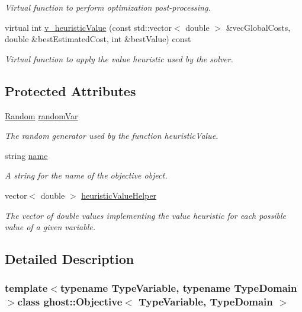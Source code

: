 \begin{DoxyCompactItemize}
\begin{DoxyCompactList}\small\item\em Virtual function to perform optimization post-\/processing. \end{DoxyCompactList}\item 
virtual int \hyperlink{classghost_1_1Objective_a03311ba62213580f1664f164e5f5696a}{v\-\_\-heuristic\-Value} (const std\-::vector$<$ double $>$ \&vec\-Global\-Costs, double \&best\-Estimated\-Cost, int \&best\-Value) const 
\begin{DoxyCompactList}\small\item\em Virtual function to apply the value heuristic used by the solver. \end{DoxyCompactList}\end{DoxyCompactItemize}
\subsection*{Protected Attributes}
\begin{DoxyCompactItemize}
\item 
\hyperlink{classghost_1_1Random}{Random} \hyperlink{classghost_1_1Objective_a442da333edc70f47c33a15987c2a81b8}{random\-Var}
\begin{DoxyCompactList}\small\item\em The random generator used by the function heuristic\-Value. \end{DoxyCompactList}\item 
string \hyperlink{classghost_1_1Objective_ae9533a52b3600c826df6e20c65db1e7a}{name}
\begin{DoxyCompactList}\small\item\em A string for the name of the objective object. \end{DoxyCompactList}\item 
vector$<$ double $>$ \hyperlink{classghost_1_1Objective_a9bfe64f13de15bba7f2fa3a662c02e27}{heuristic\-Value\-Helper}
\begin{DoxyCompactList}\small\item\em The vector of double values implementing the value heuristic for each possible value of a given variable. \end{DoxyCompactList}\end{DoxyCompactItemize}


\subsection{Detailed Description}
\subsubsection*{template$<$typename Type\-Variable, typename Type\-Domain$>$class ghost\-::\-Objective$<$ Type\-Variable, Type\-Domain $>$}

